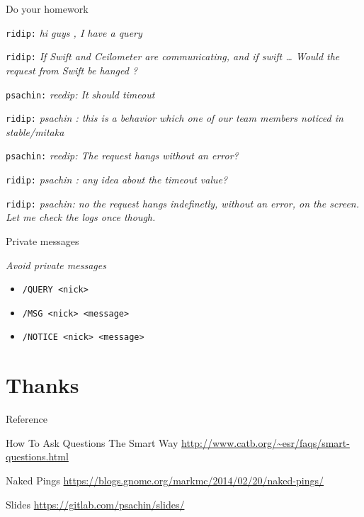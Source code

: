 \documentclass[10pt]{beamer}
\begin{document}
\begin{frame}[fragile,label={sec:org6084231}]{Do your homework}
 \begin{block}{}
\texttt{ridip:} \emph{hi guys , I have a query}

\texttt{ridip:}  \emph{If Swift and Ceilometer are communicating, and if
swift \ldots{} Would the request from Swift be hanged ?}

\texttt{psachin:}  \emph{reedip: It should timeout}

\texttt{ridip:}  \emph{psachin : this is a behavior which one of our team
members noticed in stable/mitaka}

\texttt{psachin:} \emph{reedip: The request hangs without an error?}

\texttt{ridip:} \emph{psachin : any idea about the timeout value?}

\texttt{ridip:} \emph{psachin: no the request hangs indefinetly, without an error, on the screen. Let me check the logs once though.}
\end{block}
\end{frame}

\begin{frame}[fragile,label={sec:orgae861d0}]{Private messages}
 \begin{block}{}
\centering \emph{Avoid private messages}
\end{block}

\begin{block}{}
\begin{itemize}
\item \texttt{/QUERY <nick>}

\item \texttt{/MSG <nick> <message>}

\item \texttt{/NOTICE <nick> <message>}
\end{itemize}
\end{block}
\end{frame}

\section{Thanks}
\label{sec:org1542c0a}
\begin{frame}[label={sec:org502aa52}]{Reference}
\begin{block}{How To Ask Questions The Smart Way}
\url{http://www.catb.org/\~esr/faqs/smart-questions.html}
\end{block}

\begin{block}{Naked Pings}
\url{https://blogs.gnome.org/markmc/2014/02/20/naked-pings/}
\end{block}

\begin{block}{Slides}
\url{https://gitlab.com/psachin/slides/}
\end{block}
\end{frame}
\end{document}
